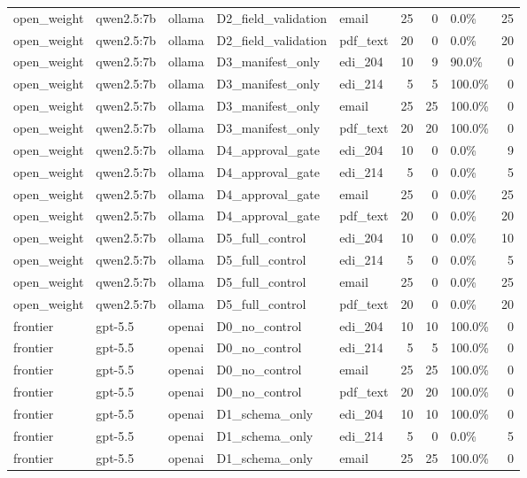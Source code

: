 \begin{tabular}{lllllrrlr}
open\_weight & qwen2.5:7b & ollama & D2\_field\_validation & email & 25 & 0 & 0.0\% & 25 \\
open\_weight & qwen2.5:7b & ollama & D2\_field\_validation & pdf\_text & 20 & 0 & 0.0\% & 20 \\
open\_weight & qwen2.5:7b & ollama & D3\_manifest\_only & edi\_204 & 10 & 9 & 90.0\% & 0 \\
open\_weight & qwen2.5:7b & ollama & D3\_manifest\_only & edi\_214 & 5 & 5 & 100.0\% & 0 \\
open\_weight & qwen2.5:7b & ollama & D3\_manifest\_only & email & 25 & 25 & 100.0\% & 0 \\
open\_weight & qwen2.5:7b & ollama & D3\_manifest\_only & pdf\_text & 20 & 20 & 100.0\% & 0 \\
open\_weight & qwen2.5:7b & ollama & D4\_approval\_gate & edi\_204 & 10 & 0 & 0.0\% & 9 \\
open\_weight & qwen2.5:7b & ollama & D4\_approval\_gate & edi\_214 & 5 & 0 & 0.0\% & 5 \\
open\_weight & qwen2.5:7b & ollama & D4\_approval\_gate & email & 25 & 0 & 0.0\% & 25 \\
open\_weight & qwen2.5:7b & ollama & D4\_approval\_gate & pdf\_text & 20 & 0 & 0.0\% & 20 \\
open\_weight & qwen2.5:7b & ollama & D5\_full\_control & edi\_204 & 10 & 0 & 0.0\% & 10 \\
open\_weight & qwen2.5:7b & ollama & D5\_full\_control & edi\_214 & 5 & 0 & 0.0\% & 5 \\
open\_weight & qwen2.5:7b & ollama & D5\_full\_control & email & 25 & 0 & 0.0\% & 25 \\
open\_weight & qwen2.5:7b & ollama & D5\_full\_control & pdf\_text & 20 & 0 & 0.0\% & 20 \\
frontier & gpt-5.5 & openai & D0\_no\_control & edi\_204 & 10 & 10 & 100.0\% & 0 \\
frontier & gpt-5.5 & openai & D0\_no\_control & edi\_214 & 5 & 5 & 100.0\% & 0 \\
frontier & gpt-5.5 & openai & D0\_no\_control & email & 25 & 25 & 100.0\% & 0 \\
frontier & gpt-5.5 & openai & D0\_no\_control & pdf\_text & 20 & 20 & 100.0\% & 0 \\
frontier & gpt-5.5 & openai & D1\_schema\_only & edi\_204 & 10 & 10 & 100.0\% & 0 \\
frontier & gpt-5.5 & openai & D1\_schema\_only & edi\_214 & 5 & 0 & 0.0\% & 5 \\
frontier & gpt-5.5 & openai & D1\_schema\_only & email & 25 & 25 & 100.0\% & 0 \\

\end{tabular}
